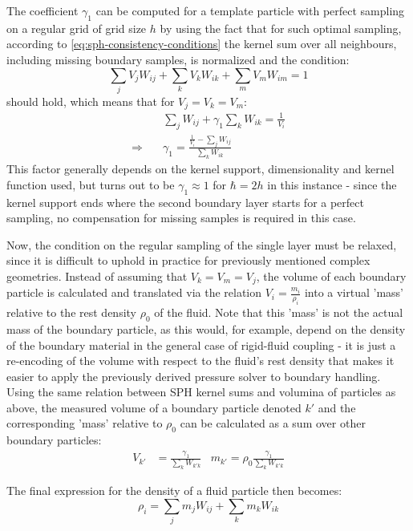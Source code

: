 The coefficient $\gamma_1$ can be computed for a template particle with perfect sampling on a regular grid of grid size $h$ by using the fact that for such optimal sampling, according to \autoref{eq:sph-consistency-conditions} the kernel sum over all neighbours, including missing boundary samples, is normalized and the condition:
\begin{equation}
  \sum_j V_j W_{ij} + \sum_k V_k W_{ik} + \sum_m V_m W_{im}=1
\end{equation}
should hold, which means that for $V_j=V_k=V_m$\autocite*{tutorial}:
\begin{align}
                        & \sum_j W_{ij} + \gamma_1 \sum_k W_{ik}= \frac{1}{V_i}        \\
  \Longrightarrow \quad & \gamma_1 = \frac{\frac{1}{V_i}-\sum_j W_{ij}}{\sum_k W_{ik}}
\end{align}
This factor generally depends on the kernel support, dimensionality and kernel function used\autocite*{tutorial}, but turns out to be $\gamma_1 \approx 1$ for $\hbar=2h$ in this instance - since the kernel support ends where the second boundary layer starts for a perfect sampling, no compensation for missing samples is required in this case.

Now, the condition on the regular sampling of the single layer must be relaxed, since it is difficult to uphold in practice for previously mentioned complex geometries. Instead of assuming that $V_k=V_m=V_j$, the volume of each boundary particle is calculated and translated via the relation $V_i=\frac{m_i}{\rho_i}$ into a virtual 'mass' relative to the rest density $\rho_0$ of the fluid. Note that this 'mass' is not the actual mass of the boundary particle, as this would, for example, depend on the density of the boundary material in the general case of rigid-fluid coupling - it is just a re-encoding of the volume with respect to the fluid's rest density that makes it easier to apply the previously derived pressure solver to boundary handling. Using the same relation between SPH kernel sums and volumina of particles as above, the measured volume of a boundary particle denoted $k'$ and the corresponding 'mass' relative to $\rho_0$ can be calculated as a sum over other boundary particles\autocite*{tutorial}:
\begin{align}\label{eq:boundary-sample-mass-and-volume}
  V_{k'} & = \frac{\gamma_1}{\sum_k W_{k' k}} & m_{k'} = \rho_0\frac{\gamma_1}{\sum_k W_{k' k}}
\end{align}

The final expression for the density of a fluid particle then becomes\autocite*{versatile-boundary-akinci12}:
\begin{equation}
  \rho_i = \sum_j m_j W_{ij} + \sum_k m_k W_{ik}
\end{equation}

